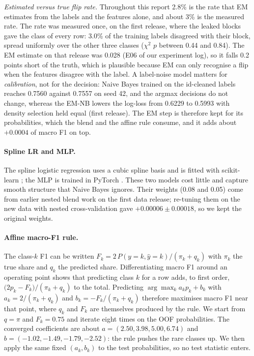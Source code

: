 \documentclass[../main.tex]{subfiles}
\begin{document}
\emph{Estimated versus true flip rate.} Throughout this report 2.8\% is the rate that EM estimates from the labels and the features alone, and about 3\% is the measured rate. The rate was measured once, on the first release, where the leaked  blocks gave the class of every row: 3.0\% of the training labels disagreed with their block, spread uniformly over the other three classes ($\chi^2$ $p$ between 0.44 and 0.84). The EM estimate on that release was 0.028 (E06 of our experiment log), so it falls 0.2 points short of the truth, which is plausible because EM can only recognise a flip when the features disagree with the label. A label-noise model matters for \emph{calibration}, not for the decision: Naive Bayes trained on the id-cleaned labels reaches 0.7560 against 0.7557 on seed 42, and the argmax decisions do not change, whereas the EM-NB lowers the log-loss from 0.6229 to 0.5993 with density selection held equal (first release). The EM step is therefore kept for its probabilities, which the blend and the affine rule consume, and it adds about $+0.0004$ of macro F1 on top.

\paragraph{Spline LR and MLP.} The spline logistic regression uses a cubic spline basis \citep{splines} and is fitted with scikit-learn \citep{sklearn}; the MLP is trained in PyTorch \citep{pytorch}. These two models cost little and capture smooth structure that Naive Bayes ignores. Their weights (0.08 and 0.05) come from earlier nested blend work on the first data release; re-tuning them on the new data with nested cross-validation gave $+0.00006\pm0.00018$, so we kept the original weights.

\paragraph{Affine macro-F1 rule.} The class-$k$ F1 can be written $F_k=2\,P(y=k,\hat y=k)/(\pi_k+q_k)$ with $\pi_k$ the true share and $q_k$ the predicted share. Differentiating macro F1 around an operating point shows that predicting class $k$ for a row adds, to first order, $\bigl(2p_k-F_k\bigr)/(\pi_k+q_k)$ to the total. Predicting $\arg\max_k a_kp_k+b_k$ with $a_k=2/(\pi_k+q_k)$ and $b_k=-F_k/(\pi_k+q_k)$ therefore maximises macro F1 near that point, where $q_k$ and $F_k$ are themselves produced by the rule. We start from $q=\pi$ and $F_k=0.75$ and iterate eight times on the OOF probabilities. The converged coefficients are about $a=(2.50, 3.98, 5.00, 6.74)$ and $b=(-1.02,-1.49,-1.79,-2.52)$: the rule pushes the rare classes up. We then apply the same fixed $(a_k,b_k)$ to the test probabilities, so no test statistic enters.
\end{document}
